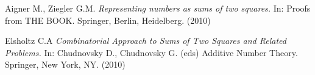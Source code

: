 \documentclass[12pt,a4paper]{amsart}
\def\HH{\mathbb{H}}
\begin{document}
%
%
%
%
% 
%



%

%
%





Aigner M., Ziegler G.M.  
\textit{Representing numbers as sums of two squares.} In: Proofs from THE BOOK. Springer, Berlin, Heidelberg. (2010)



Elsholtz C.A 
\textit{Combinatorial Approach to Sums of Two Squares and Related Problems.}
 In: Chudnovsky D., Chudnovsky G. (eds) Additive Number Theory. Springer, New York, NY.
 (2010) 
\end{document}
